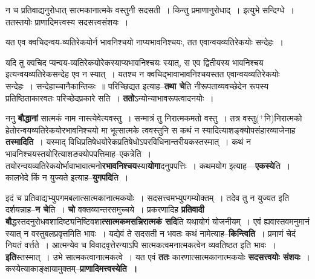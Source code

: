 \documentclass[article,12pt,a4paper]{memoir}
\newcommand{\add}[1]{($^{+}$#1)}
\begin{document}
	न च प्रतिवाद्यनुरोधात् सात्मकानात्मके वस्तुनी सदसती । किन्तु प्रमाणानुरोधाद् । इत्युभे सन्दिग्धे । ततस्तयोः प्राणादिमत्त्वस्य सदसत्त्वसंशयः ।  
	  
	यत एव क्वचिदन्वय-व्यतिरेकयोर्न भावनिश्चयो नाप्यभावनिश्चयः, तत एवान्वयव्यतिरेकयोः सन्देहः ।  
	  
	यदि तु क्वचिद प्यन्वय-व्यतिरेकयोरेकस्याप्यभावनिश्चयः स्यात्, स एव द्वितीयस्य भावनिश्चय इत्यन्वयव्यतिरेकसन्देह एव न स्यात् । यतश्च न क्वचिद्भावाभावनिश्चयस्तत एवान्वयव्यतिरेकयोः सन्देहः । सन्देहाच्चानैकान्तिकः ॥ परिच्छिद्यत इत्याह--\textbf{तथा चे}ति नीरूपताव्यवच्छेदेन रूपस्य प्रतिष्ठिताकारवतः परिच्छेदप्रकारे सति । \textbf{ततो}ऽन्योन्याभावरूपत्वादनयोः ।
	\pend
      

	  \pstart ननु \textbf{बौद्धानां} सात्मकं नाम नास्त्येवेत्यवस्तु । सन्मात्रं तु निरात्मकमतो वस्तु । तत्र वस्तु\add{नि}निरात्मको हेतोरन्वयव्यतिरेकयोरभावनिश्चयो मा भूत्सात्मके त्ववस्तुनि स कथं न स्यादित्याशङ्क्योपसंहारव्याजेनाह \textbf{तस्मादिति} । यस्माद् विधिप्रतिषेधयोरेकप्रतिषेधोऽपरविधिनान्तरीयकस्तस्मात् । कथं न भावनिश्चयस्तयोरित्याशङक्योपपत्तिमाह--एकत्रेति । तयोरन्वयव्यतिरेकयोर्भावाभावात्मनो\textbf{रभावनिश्चय}स्या\textbf{योगा}दनुपपत्तिः । कथमयोग इत्याह—\textbf{एकस्ये}ति । कालभेदे किं न युज्यते इत्याह--\textbf{युगपदि}ति ।
	\pend
      

	  \pstart इदं च प्रतिवाद्यभ्युपगमबलात्सात्मकानात्मकयोः । सदसत्त्वमभ्युपगम्योक्तम् । तदेव तु न युज्यत इति दर्शयन्नाह--\textbf{न चे}ति । \textbf{चो} वक्तव्यान्तरसमुच्चये । प्रकरणादिह \textbf{प्रतिवादी बौ}द्धस्तदनुरोधवशादिष्ट्यनिष्टिवशा\textbf{त्सात्मकमसन्निरात्मकं सदि}ति यथायोगं योजनीयम् । एवं ह्यवास्तवमनुमानं स्यात् न वस्तुबलप्रवृत्तमिति भावः । यद्येवं ते सदसती न भवतः कथं नामेत्याह--\textbf{किन्त्विति} । प्रमाणं चेदं नियतं वर्त्तते । आत्मन्येव च विवादवृत्तेरन्याऽपि  सात्मकत्वमनात्मकत्वेन  व्यवतिष्ठत इति भावः । \textbf{इति}स्तस्मात् । उभे सात्मकत्वानात्मकत्वे । यत एवं \textbf{ततः} कारणात्सात्मकानात्मकयोः \textbf{सदसत्त्वयोः संशयः} । कस्येत्याकाङ्क्षायामुक्तम्--\textbf{प्राणादिमत्त्वस्येति ।}
	\pend
	  \bigskip
	  \begingroup
	
\end{document}
